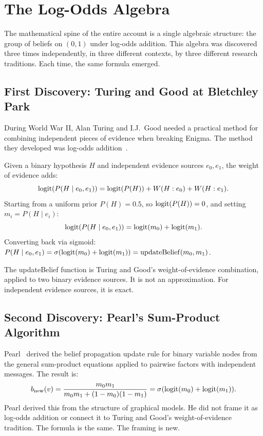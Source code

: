 \section{The Log-Odds Algebra}
\label{sec:log-odds}

The mathematical spine of the entire account is a single algebraic structure: the group of beliefs on $(0,1)$ under log-odds addition. This algebra was discovered three times independently, in three different contexts, by three different research traditions. Each time, the same formula emerged.

\subsection*{First Discovery: Turing and Good at Bletchley Park}

During World War II, Alan Turing and I.J.\ Good needed a practical method for combining independent pieces of evidence when breaking Enigma. The method they developed was log-odds addition~\cite{good1950probability}.

Given a binary hypothesis $H$ and independent evidence sources $e_0, e_1$, the weight of evidence adds:
\[
\operatorname{logit}(P(H \mid e_0, e_1)) = \operatorname{logit}(P(H)) + W(H : e_0) + W(H : e_1).
\]
Starting from a uniform prior $P(H) = 0.5$, so $\operatorname{logit}(P(H)) = 0$, and setting $m_i = P(H \mid e_i)$:
\[
\operatorname{logit}(P(H \mid e_0, e_1)) = \operatorname{logit}(m_0) + \operatorname{logit}(m_1).
\]
Converting back via sigmoid: $P(H \mid e_0, e_1) = \sigma(\operatorname{logit}(m_0) + \operatorname{logit}(m_1)) = \mathrm{updateBelief}(m_0, m_1)$.

The updateBelief function is Turing and Good's weight-of-evidence combination, applied to two binary evidence sources. It is not an approximation. For independent evidence sources, it is exact.

\subsection*{Second Discovery: Pearl's Sum-Product Algorithm}

Pearl~\cite{pearl1988probabilistic} derived the belief propagation update rule for binary variable nodes from the general sum-product equations applied to pairwise factors with independent messages. The result is:
\[
b_{\mathrm{new}}(v) = \frac{m_0 m_1}{m_0 m_1 + (1-m_0)(1-m_1)} = \sigma(\operatorname{logit}(m_0) + \operatorname{logit}(m_1)).
\]
Pearl derived this from the structure of graphical models. He did not frame it as log-odds addition or connect it to Turing and Good's weight-of-evidence tradition. The formula is the same. The framing is new.

